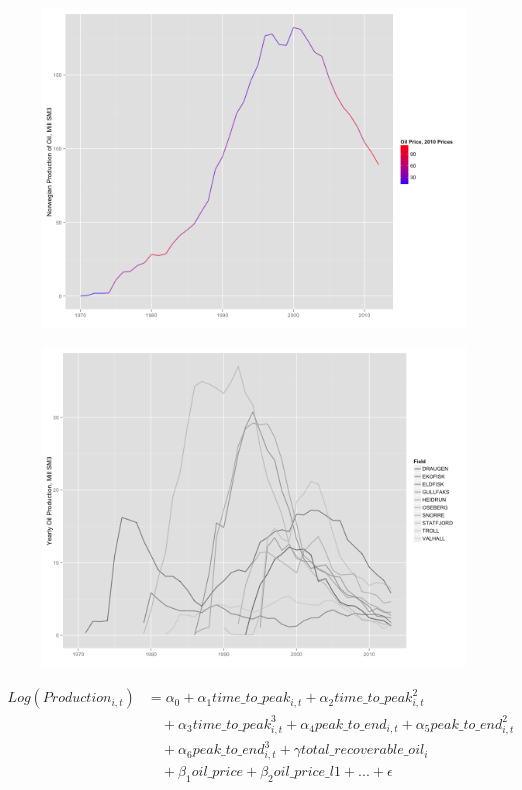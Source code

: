 \documentclass{beamer}
\begin{document}
\begin{frame}[plain]

\begin{figure}
	\includegraphics[width=.8\textwidth]{figures/oil_decline.png}
	
	\label{oil_decline}
\end{figure}

\end{frame}


\begin{frame}[plain]
	\begin{figure}
	\includegraphics[width=.8\textwidth]{figures/top10_production.png}
	
	\label{top10_production}	
	\end{figure}
\end{frame}



\begin{frame}[plain]
	\begin{equation}
		\begin{split}
		 Log(Production_{i,t}) & = \alpha_0 + \alpha_1 time\_to\_peak_{i,t} + \alpha_2 time\_to\_peak_{i,t}^2 \\
		& \quad + \alpha_3 time\_to\_peak_{i,t}^3  + \alpha_4 peak\_to\_end_{i,t} + \alpha_5 peak\_to\_end_{i,t}^2 \\
		& \quad + \alpha_6 peak\_to\_end_{i,t}^3 + \gamma total\_recoverable\_oil_i \\
		& \quad + \beta_1 oil\_price + \beta_2 oil\_price\_l1 + ...+ \epsilon
		\end{split}
	\label{glm_eqn}
		\end{equation}
\end{frame}
\end{document}
